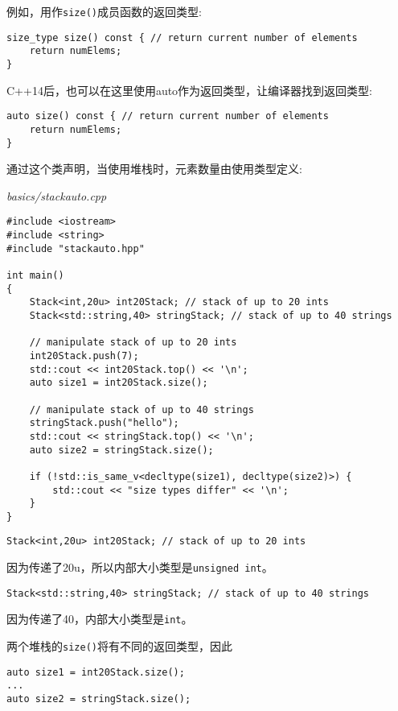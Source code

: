 例如，用作\texttt{size()}成员函数的返回类型:

\begin{lstlisting}[style=styleCXX]
size_type size() const { // return current number of elements
	return numElems;
}
\end{lstlisting}

C++14后，也可以在这里使用auto作为返回类型，让编译器找到返回类型:

\begin{lstlisting}[style=styleCXX]
auto size() const { // return current number of elements
	return numElems;
}
\end{lstlisting}

通过这个类声明，当使用堆栈时，元素数量由使用类型定义:

\noindent
\textit{basics/stackauto.cpp}
\begin{lstlisting}[style=styleCXX]
#include <iostream>
#include <string>
#include "stackauto.hpp"

int main()
{
	Stack<int,20u> int20Stack; // stack of up to 20 ints
	Stack<std::string,40> stringStack; // stack of up to 40 strings
	
	// manipulate stack of up to 20 ints
	int20Stack.push(7);
	std::cout << int20Stack.top() << '\n';
	auto size1 = int20Stack.size();
	
	// manipulate stack of up to 40 strings
	stringStack.push("hello");
	std::cout << stringStack.top() << '\n';
	auto size2 = stringStack.size();
	
	if (!std::is_same_v<decltype(size1), decltype(size2)>) {
		std::cout << "size types differ" << '\n';
	}
}
\end{lstlisting}


\begin{lstlisting}[style=styleCXX]
Stack<int,20u> int20Stack; // stack of up to 20 ints
\end{lstlisting}

因为传递了20u，所以内部大小类型是\texttt{unsigned int}。

\begin{lstlisting}[style=styleCXX]
Stack<std::string,40> stringStack; // stack of up to 40 strings
\end{lstlisting}

因为传递了40，内部大小类型是\texttt{int}。

两个堆栈的\texttt{size()}将有不同的返回类型，因此

\begin{lstlisting}[style=styleCXX]
auto size1 = int20Stack.size();
...
auto size2 = stringStack.size();
\end{lstlisting}

